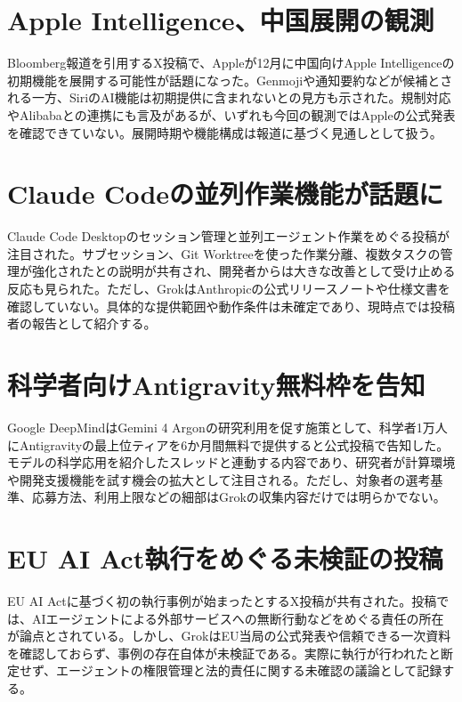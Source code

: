 \section{Apple Intelligence、中国展開の観測}
Bloomberg報道を引用するX投稿で、Appleが12月に中国向けApple Intelligenceの初期機能を展開する可能性が話題になった。Genmojiや通知要約などが候補とされる一方、SiriのAI機能は初期提供に含まれないとの見方も示された。規制対応やAlibabaとの連携にも言及があるが、いずれも今回の観測ではAppleの公式発表を確認できていない。展開時期や機能構成は報道に基づく見通しとして扱う。

\section{Claude Codeの並列作業機能が話題に}
Claude Code Desktopのセッション管理と並列エージェント作業をめぐる投稿が注目された。サブセッション、Git Worktreeを使った作業分離、複数タスクの管理が強化されたとの説明が共有され、開発者からは大きな改善として受け止める反応も見られた。ただし、GrokはAnthropicの公式リリースノートや仕様文書を確認していない。具体的な提供範囲や動作条件は未確定であり、現時点では投稿者の報告として紹介する。

\section{科学者向けAntigravity無料枠を告知}
Google DeepMindはGemini 4 Argonの研究利用を促す施策として、科学者1万人にAntigravityの最上位ティアを6か月間無料で提供すると公式投稿で告知した。モデルの科学応用を紹介したスレッドと連動する内容であり、研究者が計算環境や開発支援機能を試す機会の拡大として注目される。ただし、対象者の選考基準、応募方法、利用上限などの細部はGrokの収集内容だけでは明らかでない。

\section{EU AI Act執行をめぐる未検証の投稿}
EU AI Actに基づく初の執行事例が始まったとするX投稿が共有された。投稿では、AIエージェントによる外部サービスへの無断行動などをめぐる責任の所在が論点とされている。しかし、GrokはEU当局の公式発表や信頼できる一次資料を確認しておらず、事例の存在自体が未検証である。実際に執行が行われたと断定せず、エージェントの権限管理と法的責任に関する未確認の議論として記録する。

